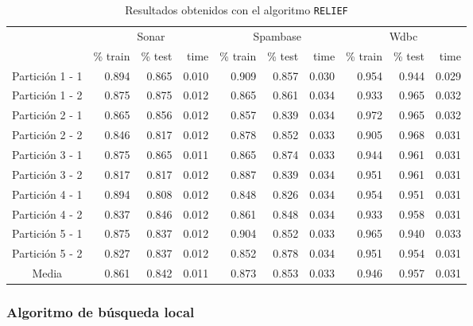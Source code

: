 \documentclass[11pt]{article}
\theoremstyle{plain}
\theoremstyle{definition}
\begin{document}
\begin{table}[H]
\centering
\caption{Resultados obtenidos con el algoritmo \texttt{RELIEF}}
\label{tbl-relief}
\begin{tabular}{@{}crrrrrrrrr@{}}
  \toprule
  & \multicolumn{3}{c}{Sonar} & \multicolumn{3}{c}{Spambase} & \multicolumn{3}{c}{Wdbc}  \\
  \cmidrule(r){2-10}
           & \% train & \% test & time & \% train   & \% test   & time & \% train & \% test & time \\
  \midrule
Partición 1 - 1      & 0.894 & 0.865 & 0.010  & 0.909 & 0.857 & 0.030   & 0.954 & 0.944 & 0.029   \\
Partición 1 - 2      & 0.875 & 0.875 & 0.012  & 0.865 & 0.861 & 0.034   & 0.933 & 0.965 & 0.032   \\
Partición 2 - 1      & 0.865 & 0.856 & 0.012  & 0.857 & 0.839 & 0.034   & 0.972 & 0.965 & 0.032   \\
Partición 2 - 2      & 0.846 & 0.817 & 0.012  & 0.878 & 0.852 & 0.033   & 0.905 & 0.968 & 0.031   \\
Partición 3 - 1      & 0.875 & 0.865 & 0.011  & 0.865 & 0.874 & 0.033   & 0.944 & 0.961 & 0.031   \\
Partición 3 - 2      & 0.817 & 0.817 & 0.012  & 0.887 & 0.839 & 0.034   & 0.951 & 0.961 & 0.031   \\
Partición 4 - 1      & 0.894 & 0.808 & 0.012  & 0.848 & 0.826 & 0.034   & 0.954 & 0.951 & 0.031   \\
Partición 4 - 2      & 0.837 & 0.846 & 0.012  & 0.861 & 0.848 & 0.034   & 0.933 & 0.958 & 0.031   \\
Partición 5 - 1      & 0.875 & 0.837 & 0.012  & 0.904 & 0.852 & 0.033   & 0.965 & 0.940 & 0.033   \\
Partición 5 - 2      & 0.827 & 0.837 & 0.012  & 0.852 & 0.878 & 0.034   & 0.951 & 0.954 & 0.031   \\
  \bottomrule
Media                & 0.861 & 0.842 & 0.011  & 0.873 & 0.853 & 0.033   & 0.946 & 0.957 & 0.031   \\
\end{tabular}
\end{table}

\subsubsection{Algoritmo de búsqueda local}
\end{document}
